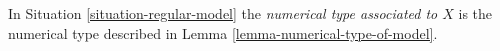 \begin{definition}
\label{definition-numerical-type-model}
In Situation \ref{situation-regular-model} the
{\it numerical type associated to $X$} is the numerical
type described in Lemma \ref{lemma-numerical-type-of-model}.
\end{definition}